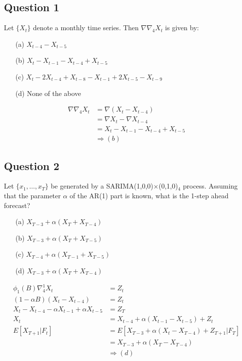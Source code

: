 \subsection*{Question 1}

Let \(\{X_t\}\) denote a monthly time series. Then \(\nabla \nabla_4 X_t\) is given by:

\begin{itemize}
    \item[(a)] \(X_{t-4} - X_{t-5}\)
    \item[(b)] \(X_t - X_{t-1} - X_{t-4} + X_{t-5}\)
    \item[(c)] \(X_t - 2X_{t-4} + X_{t-8} - X_{t-1} + 2X_{t-5} - X_{t-9}\)
    \item[(d)] None of the above
\end{itemize}

\begin{footnotesize}
\begin{align*}
    \nabla \nabla_4 X_t &= \nabla(X_t - X_{t-4}) \\
    &= \nabla X_t - \nabla X_{t-4} \\
&= X_t-X_{t-1} -X_{t-4} + X_{t-5}\\
&\Rightarrow (b)
\end{align*}
\end{footnotesize}


\subsection*{Question 2}

Let $\{x_1, \ldots,x_T\}$ be generated by a SARIMA(1,0,0)$\times$(0,1,0)$_4$ process. Assuming that the parameter $\alpha$ of the AR(1) part is known, what is the 1-step ahead forecast?  

\begin{itemize}
    \item[(a)] $X_{T-3}+\alpha(X_T + X_{T-4}) $
    \item[(b)] $X_{T-3}+\alpha(X_T + X_{T-5}) $
    \item[(c)] $X_{T-4}+\alpha(X_{T-1} + X_{T-5}) $
    \item[(d)] $X_{T-3}+\alpha(X_T + X_{T-4}) $
\end{itemize}

\begin{footnotesize}
\begin{align*}
    \phi_1 (B) \nabla^1_4 X_t &= Z_t \\
    (1-\alpha B)(X_t-X_{t-4}) &= Z_t \\
    X_t-X_{t-4} - \alpha X_{t-1} + \alpha X_{t-5} &= Z_T\\
    X_t &= X_{t-4} + \alpha(X_{t-1} - X_{t-5}) + Z_t \\
    E[X_{T+1}|F_t] &= E[X_{T-3} + \alpha (X_t - X_{T-4}) + Z_{T+1} | F_T] \\
    &= X_{T-3} + \alpha (X_T - X_{T-4} ) \\
&\Rightarrow (d)
\end{align*}
\end{footnotesize}





